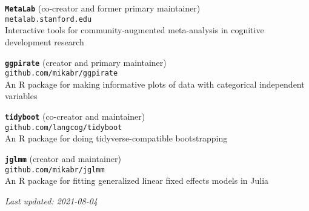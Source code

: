 \documentclass[11pt,]{article}
\begin{document}
\textbf{\texttt{MetaLab}} (co-creator and former primary maintainer)\\
\hspace*{0.333em}\hspace*{0.333em}\hspace*{0.333em}\hspace*{0.333em}\texttt{metalab.stanford.edu}\\
\hspace*{0.333em}\hspace*{0.333em}\hspace*{0.333em}\hspace*{0.333em}Interactive
tools for community-augmented meta-analysis in cognitive development
research

\textbf{\texttt{ggpirate}} (creator and primary maintainer)\\
\hspace*{0.333em}\hspace*{0.333em}\hspace*{0.333em}\hspace*{0.333em}\texttt{github.com/mikabr/ggpirate}\\
\hspace*{0.333em}\hspace*{0.333em}\hspace*{0.333em}\hspace*{0.333em}An R
package for making informative plots of data with categorical
independent variables

\textbf{\texttt{tidyboot}} (co-creator and maintainer)\\
\hspace*{0.333em}\hspace*{0.333em}\hspace*{0.333em}\hspace*{0.333em}\texttt{github.com/langcog/tidyboot}\\
\hspace*{0.333em}\hspace*{0.333em}\hspace*{0.333em}\hspace*{0.333em}An R
package for doing tidyverse-compatible bootstrapping

\textbf{\texttt{jglmm}} (creator and maintainer)\\
\hspace*{0.333em}\hspace*{0.333em}\hspace*{0.333em}\hspace*{0.333em}\texttt{github.com/mikabr/jglmm}\\
\hspace*{0.333em}\hspace*{0.333em}\hspace*{0.333em}\hspace*{0.333em}An R
package for fitting generalized linear fixed effects models in Julia

\centering
\vspace{2em}

\emph{Last updated: 2021-08-04}
\end{document}
